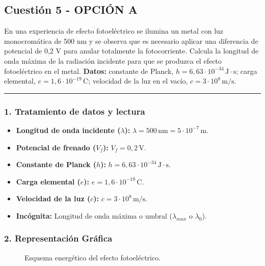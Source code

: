\subsection{Cuestión 5 - OPCIÓN A}
\label{subsec:5A_2018_jun_ord}
\begin{cajaenunciado}
En una experiencia de efecto fotoeléctrico se ilumina un metal con luz monocromática de 500 nm y se observa que es necesario aplicar una diferencia de potencial de 0,2 V para anular totalmente la fotocorriente. Calcula la longitud de onda máxima de la radiación incidente para que se produzca el efecto fotoeléctrico en el metal.
\textbf{Datos:} constante de Planck, $h=6,63\cdot10^{-34}\,\text{J}\cdot\text{s}$; carga elemental, $e=1,6\cdot10^{-19}\,\text{C}$; velocidad de la luz en el vacío, $c=3\cdot10^{8}\,\text{m/s}$.
\end{cajaenunciado}
\hrule

\subsubsection*{1. Tratamiento de datos y lectura}
\begin{itemize}
    \item \textbf{Longitud de onda incidente ($\lambda$):} $\lambda = 500 \, \text{nm} = 5 \cdot 10^{-7} \, \text{m}$.
    \item \textbf{Potencial de frenado ($V_f$):} $V_f = 0,2 \, \text{V}$.
    \item \textbf{Constante de Planck ($h$):} $h=6,63\cdot10^{-34}\,\text{J}\cdot\text{s}$.
    \item \textbf{Carga elemental ($e$):} $e=1,6\cdot10^{-19}\,\text{C}$.
    \item \textbf{Velocidad de la luz ($c$):} $c=3\cdot10^{8}\,\text{m/s}$.
    \item \textbf{Incógnita:} Longitud de onda máxima o umbral ($\lambda_{max}$ o $\lambda_0$).
\end{itemize}

\subsubsection*{2. Representación Gráfica}
\begin{figure}[H]
    \centering
    \caption{Esquema energético del efecto fotoeléctrico.}
\end{figure}

